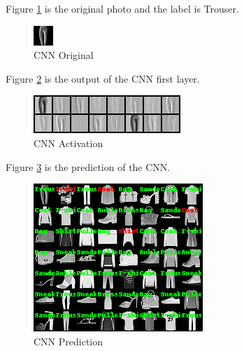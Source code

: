 \documentclass{../../Latex_Template/Homework/homework}
\begin{document}
\begin{arabicparts}
    \questionpart
    Figure \ref{fig:cnn_original} is the original photo and the label is Trouser.
    \begin{figure}[H]
      \begin{center}
        \includegraphics[width=0.5\linewidth]{CNN_original.png}
        \caption{CNN Original}
        \label{fig:cnn_original}
      \end{center}
    \end{figure}

    Figure \ref{fig:cnn_activation} is the output of the CNN first layer.
    \begin{figure}[H]
      \begin{center}
        \includegraphics[width=0.5\linewidth]{CNN_activation.png}
        \caption{CNN Activation}
        \label{fig:cnn_activation}
      \end{center}
    \end{figure}

    \newpage

    \questionpart
    Figure \ref{fig:cnn_prediction} is the prediction of the CNN.
    \begin{figure}[H]
      \begin{center}
        \includegraphics[width=0.5\linewidth]{CNN_predict.png}
        \caption{CNN Prediction}
        \label{fig:cnn_prediction}
      \end{center}
    \end{figure}

  \end{arabicparts}
\end{document}
